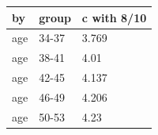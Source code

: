 \begingroup\small
\setlength{\tabcolsep}{3pt}
\renewcommand{\arraystretch}{1.04}
\begin{tabularx}{\linewidth}{XXX}
\toprule
by & group & c with 8/10 \\
\midrule
age & 34-37 & 3.769 \\
age & 38-41 & 4.01 \\
age & 42-45 & 4.137 \\
age & 46-49 & 4.206 \\
age & 50-53 & 4.23 \\
\bottomrule
\end{tabularx}
\endgroup
